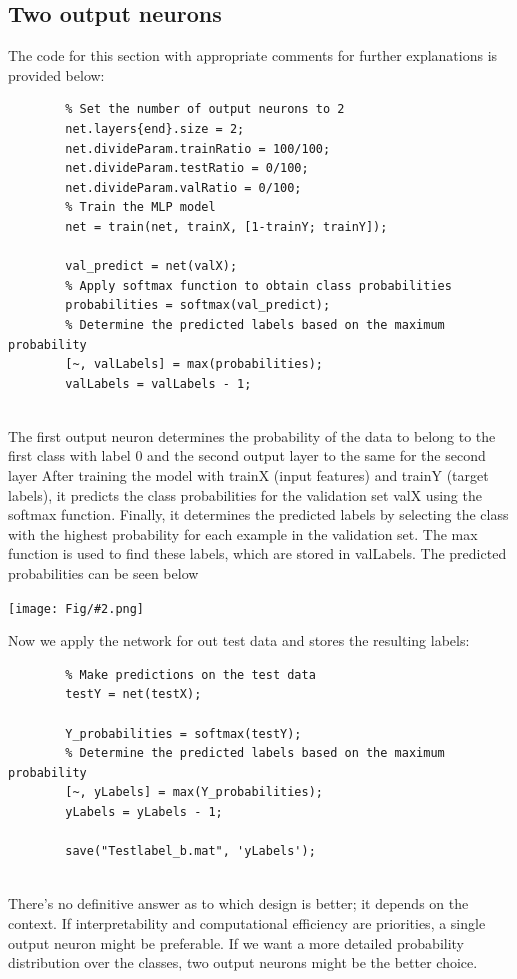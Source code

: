 \documentclass[]{article}
\newcommand{\pict}[2]{\begin{center}
		\texttt{[image: Fig/\#2.png]}
\end{center}}
\begin{document}
	\subsection{Two output neurons}
	The code for this section with appropriate comments for further explanations is provided below: 
	\begin{lstlisting}
		% Set the number of output neurons to 2
		net.layers{end}.size = 2;
		net.divideParam.trainRatio = 100/100;
		net.divideParam.testRatio = 0/100;
		net.divideParam.valRatio = 0/100;
		% Train the MLP model
		net = train(net, trainX, [1-trainY; trainY]);
		
		val_predict = net(valX);
		% Apply softmax function to obtain class probabilities
		probabilities = softmax(val_predict);
		% Determine the predicted labels based on the maximum probability
		[~, valLabels] = max(probabilities);
		valLabels = valLabels - 1;
		
	\end{lstlisting}
	The first output neuron determines  the probability of the data to belong to the first class with label 0 and the second output layer to the same for the second layer
	After training the model with trainX (input features) and trainY (target labels), it predicts the class probabilities for the validation set valX using the softmax function. Finally, it determines the predicted labels by selecting the class with the highest probability for each example in the validation set. The max function is used to find these labels, which are stored in valLabels. The predicted probabilities can be seen below
	\pict{0.8}{F16}
	Now we apply the network for out test data and stores the resulting labels:
	\begin{lstlisting}
		% Make predictions on the test data
		testY = net(testX);
		
		Y_probabilities = softmax(testY);
		% Determine the predicted labels based on the maximum probability
		[~, yLabels] = max(Y_probabilities);
		yLabels = yLabels - 1;
		
		save("Testlabel_b.mat", 'yLabels');
		
	\end{lstlisting}
	There’s no definitive answer as to which design is better; it depends on the context. If interpretability and computational efficiency are priorities, a single output neuron might be preferable. If we want a more detailed probability distribution over the classes, two output neurons might be the better choice.
	
\newpage
\end{document}
